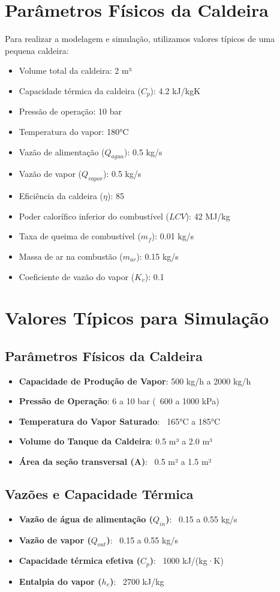 \documentclass{article}
\begin{document}
\section{Parâmetros Físicos da Caldeira}
Para realizar a modelagem e simulação, utilizamos valores típicos de uma pequena caldeira:
\begin{itemize}
    \item Volume total da caldeira: 2 m³
    \item Capacidade térmica da caldeira ($C_p$): 4.2 kJ/kgK
    \item Pressão de operação: 10 bar
    \item Temperatura do vapor: 180°C
    \item Vazão de alimentação ($Q_{agua}$): 0.5 kg/s
    \item Vazão de vapor ($Q_{vapor}$): 0.5 kg/s
    \item Eficiência da caldeira ($\eta$): 85%
    \item Poder calorífico inferior do combustível ($LCV$): 42 MJ/kg
    \item Taxa de queima de combustível ($m_f$): 0.01 kg/s
    \item Massa de ar na combustão ($m_{ar}$): 0.15 kg/s
    \item Coeficiente de vazão do vapor ($K_v$): 0.1
\end{itemize}

\section{Valores Típicos para Simulação}

\subsection{Parâmetros Físicos da Caldeira}
\begin{itemize}
    \item \textbf{Capacidade de Produção de Vapor}: 500 kg/h a 2000 kg/h
    \item \textbf{Pressão de Operação}: 6 a 10 bar (~600 a 1000 kPa)
    \item \textbf{Temperatura do Vapor Saturado}: ~165°C a 185°C
    \item \textbf{Volume do Tanque da Caldeira}: 0.5 m³ a 2.0 m³
    \item \textbf{Área da seção transversal (A)}: ~0.5 m² a 1.5 m²
\end{itemize}

\subsection{Vazões e Capacidade Térmica}
\begin{itemize}
    \item \textbf{Vazão de água de alimentação ($Q_{in}$)}: ~0.15 a 0.55 kg/s
    \item \textbf{Vazão de vapor ($Q_{out}$)}: ~0.15 a 0.55 kg/s
    \item \textbf{Capacidade térmica efetiva ($C_p$)}: ~1000 kJ/(kg·K)
    \item \textbf{Entalpia do vapor ($h_v$)}: ~2700 kJ/kg
\end{itemize}
\end{document}

